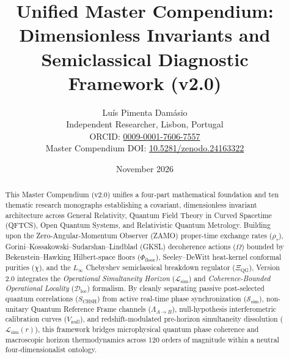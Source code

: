 \documentclass[11pt,a4paper]{article}
\title{\textbf{Unified Master Compendium: Dimensionless Invariants and Semiclassical Diagnostic Framework (v2.0)}}
\author{Luís {Pimenta Damásio}\\
\small Independent Researcher, Lisbon, Portugal\\
\small ORCID: \href{https://orcid.org/0009-0001-7606-7557}{0009-0001-7606-7557}\\
\small Master Compendium DOI: \href{https://doi.org/10.5281/zenodo.24163322}{10.5281/zenodo.24163322}}
\date{November 2026}
\begin{document}
\maketitle

\noindent{}

\vspace{1em}

\begin{abstract}
This Master Compendium (v2.0) unifies a four-part mathematical foundation and ten thematic research monographs establishing a covariant, dimensionless invariant architecture across General Relativity, Quantum Field Theory in Curved Spacetime (QFTCS), Open Quantum Systems, and Relativistic Quantum Metrology. Building upon the Zero-Angular-Momentum Observer (ZAMO) proper-time exchange rates ($\rho_\tau$), Gorini--Kossakowski--Sudarshan--Lindblad (GKSL) decoherence actions ($\Omega$) bounded by Bekenstein--Hawking Hilbert-space floors ($\Phi_{\mathrm{floor}}$), Seeley--DeWitt heat-kernel conformal purities ($\chi$), and the $L_\infty$ Chebyshev semiclassical breakdown regulator ($\Xi_{\mathrm{QG}}$), Version 2.0 integrates the \emph{Operational Simultaneity Horizon} ($\mathcal{L}_{\mathrm{sim}}$) and \emph{Coherence-Bounded Operational Locality} ($\mathcal{D}_{\mathrm{loc}}$) formalism. By cleanly separating passive post-selected quantum correlations ($S_{\mathrm{CHSH}}$) from active real-time phase synchronization ($\mathcal{S}_{\mathrm{sim}}$), non-unitary Quantum Reference Frame channels ($\Lambda_{A\to B}$), null-hypothesis interferometric calibration curves ($V_{\mathrm{null}}$), and redshift-modulated pre-horizon simultaneity dissolution ($\mathcal{L}_{\mathrm{sim}}(r)$), this framework bridges microphysical quantum phase coherence and macroscopic horizon thermodynamics across 120 orders of magnitude within a neutral four-dimensionalist ontology.
\end{abstract}
\end{document}
